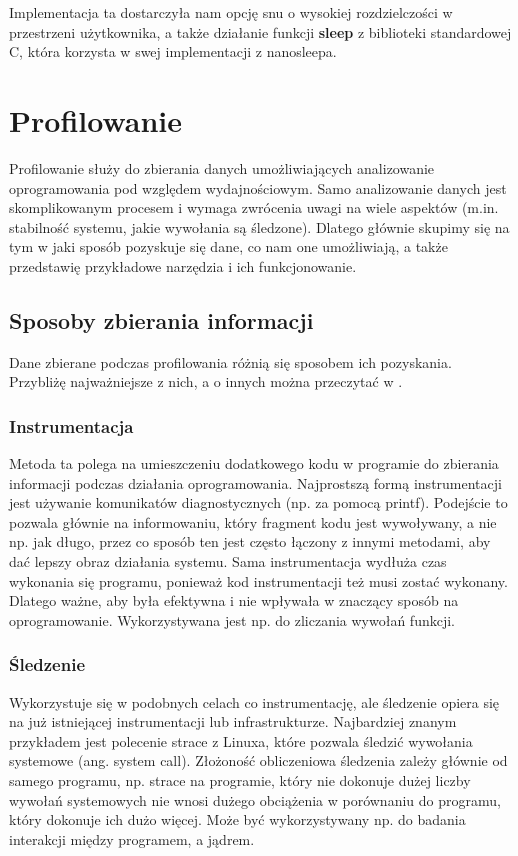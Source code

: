 \documentclass[shortabstract]{iithesis}
\theoremstyle{definition} \newtheorem*{definition}{Definicja}
\theoremstyle{definition} \newtheorem*{example}{Przykład}
\theoremstyle{definition} \newtheorem*{remark}{Uwaga}
\begin{document}
Implementacja ta dostarczyła nam opcję snu o wysokiej rozdzielczości w przestrzeni użytkownika, a także działanie funkcji \textbf{sleep} \cite{bib:sleep-manual} z biblioteki standardowej C, która korzysta w swej implementacji z nanosleepa.


\chapter{Profilowanie}
Profilowanie służy do zbierania danych umożliwiających analizowanie oprogramowania pod względem wydajnościowym. Samo analizowanie danych jest skomplikowanym procesem i wymaga zwrócenia uwagi na wiele aspektów (m.in. stabilność systemu, jakie wywołania są śledzone). Dlatego głównie skupimy się na tym w jaki sposób pozyskuje się dane, co nam one umożliwiają, a także przedstawię przykładowe narzędzia i ich funkcjonowanie.

\section{Sposoby zbierania informacji} 
Dane zbierane podczas profilowania różnią się sposobem ich pozyskania. Przybliżę najważniejsze z nich, a o innych można przeczytać w \cite{bib:denis}.

\subsection{Instrumentacja}

Metoda ta polega na umieszczeniu dodatkowego kodu w programie do zbierania informacji podczas działania oprogramowania. Najprostszą formą instrumentacji jest używanie komunikatów diagnostycznych (np. za pomocą printf). Podejście to pozwala głównie na informowaniu, który fragment kodu jest wywoływany, a nie np. jak długo, przez co sposób ten jest często łączony z innymi metodami, aby dać lepszy obraz działania systemu. Sama instrumentacja wydłuża czas wykonania się programu, ponieważ kod instrumentacji też musi zostać wykonany. Dlatego ważne, aby była efektywna i nie wpływała w znaczący sposób na oprogramowanie. Wykorzystywana jest np. do zliczania wywołań funkcji.

\subsection{Śledzenie}

Wykorzystuje się w podobnych celach co instrumentację, ale śledzenie opiera się na już istniejącej instrumentacji lub infrastrukturze. Najbardziej znanym przykładem jest polecenie strace z Linuxa, które pozwala śledzić wywołania systemowe (ang. system call). Złożoność obliczeniowa śledzenia zależy głównie od samego programu, np. strace na programie, który nie dokonuje dużej liczby wywołań systemowych nie wnosi dużego obciążenia w porównaniu do programu, który dokonuje ich dużo więcej. Może być wykorzystywany np. do badania interakcji między programem, a jądrem.
\end{document}
